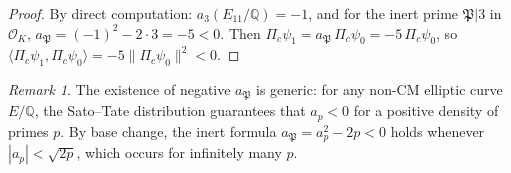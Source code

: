 \documentclass[11pt,a4paper]{article}
\theoremstyle{plain}
\theoremstyle{definition}
\theoremstyle{remark}
\newtheorem{remark}[theorem]{Remark}
\numberwithin{equation}{section}
\providecommand{\QQ}{\mathbb{Q}}
\providecommand{\cO}{\mathcal{O}}
\providecommand{\fP}{\mathfrak{P}}
\begin{document}
\begin{proof}
By direct computation: $a_3(E_{11}/\QQ) = -1$, and for the inert prime
$\fP | 3$ in $\cO_K$, $a_\fP = (-1)^2 - 2\cdot 3 = -5 < 0$.
Then $\Pi_c\psi_1 = a_\fP\,\Pi_c\psi_0 = -5\,\Pi_c\psi_0$, so
$\langle \Pi_c\psi_1, \Pi_c\psi_0 \rangle = -5\|\Pi_c\psi_0\|^2 < 0$.
\end{proof}

\begin{remark}
The existence of negative $a_\fP$ is generic: for any non-CM elliptic
curve $E/\QQ$, the Sato--Tate distribution guarantees that $a_p < 0$
for a positive density of primes $p$.  By base change, the inert formula
$a_\fP = a_p^2 - 2p < 0$ holds whenever $|a_p| < \sqrt{2p}$, which
occurs for infinitely many $p$.
\end{remark}
\end{document}
